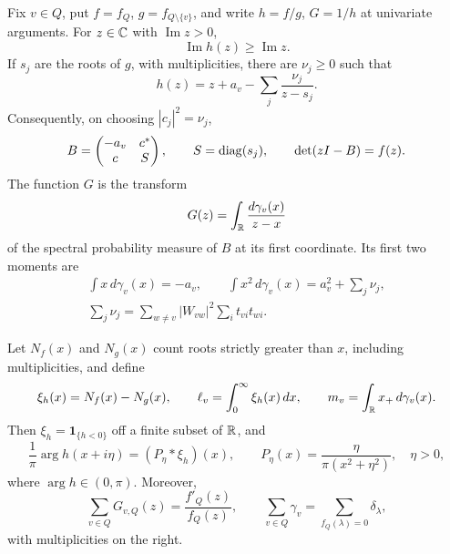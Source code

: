 \begin{lemma}\label{lem:local-data}
Fix $v\in Q$, put $f=f_Q$, $g=f_{Q\setminus\{v\}}$, and write
$h=f/g$, $G=1/h$ at univariate arguments. For $z\in\mathbb C$ with
$\operatorname{Im}z>0$,
\begin{equation}\label{poly:pick-inequality}
 \operatorname{Im}h(z)\geq\operatorname{Im}z.
\end{equation}
If $s_j$ are the roots of $g$, with multiplicities, there are
$\nu_j\geq0$ such that
\begin{equation}\label{poly:arrow-quotient}
 h(z)=z+a_v-\sum_j\frac{\nu_j}{z-s_j}.
\end{equation}
Consequently, on choosing $|c_j|^2=\nu_j$,
\begin{equation}\label{poly:arrow-matrix}
 B=\begin{pmatrix}-a_v&c^*\\ c&S\end{pmatrix},
 \qquad S=\operatorname{diag}(s_j),
 \qquad \det(zI-B)=f(z).
\end{equation}
The function $G$ is the transform
\begin{equation}\label{poly:stieltjes}
 G(z)=\int_\mathbb R\frac{d\gamma_v(x)}{z-x}
\end{equation}
of the spectral probability measure of $B$ at its first coordinate.
Its first two moments are
\begin{equation}\label{poly:moments}
 \begin{gathered}
 \int x\,d\gamma_v(x)=-a_v,
 \qquad
 \int x^2\,d\gamma_v(x)=a_v^2+\sum_j\nu_j,
 \\
 \sum_j\nu_j=\sum_{w\ne v}|W_{vw}|^2\sum_i t_{vi}t_{wi}.
 \end{gathered}
\end{equation}

Let $N_f(x)$ and $N_g(x)$ count roots strictly greater than $x$, including
multiplicities, and define
\begin{equation}\label{poly:local-functionals}
 \xi_h(x)=N_f(x)-N_g(x),\qquad
 \ell_v=\int_0^\infty\xi_h(x)\,dx,\qquad
 m_v=\int_\mathbb R x_+\,d\gamma_v(x).
\end{equation}
Then $\xi_h=\mathbf1_{\{h<0\}}$ off a finite subset of $\mathbb R$, and
\begin{equation}\label{poly:poisson}
 \frac{1}{\pi}\arg h(x+i\eta)
   =(P_\eta*\xi_h)(x),
 \qquad P_\eta(x)=\frac{\eta}{\pi(x^2+\eta^2)},\quad\eta>0,
\end{equation}
where $\arg h\in(0,\pi)$. Moreover,
\begin{equation}\label{poly:sum-local-measures}
 \sum_{v\in Q}G_{v,Q}(z)=\frac{f'_Q(z)}{f_Q(z)},
 \qquad
 \sum_{v\in Q}\gamma_v=\sum_{f_Q(\lambda)=0}\delta_\lambda,
\end{equation}
with multiplicities on the right.


\end{lemma}
